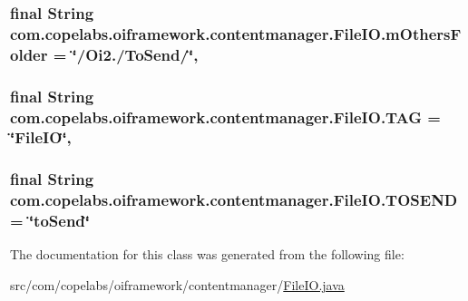 \subsubsection[{m\+Others\+Folder}]{\setlength{\rightskip}{0pt plus 5cm}final String com.\+copelabs.\+oiframework.\+contentmanager.\+File\+I\+O.\+m\+Others\+Folder = \char`\"{}/Oi2./To\+Send/\char`\"{}\hspace{0.3cm}{\ttfamily [static]}, {\ttfamily [private]}}\label{classcom_1_1copelabs_1_1oiframework_1_1contentmanager_1_1_file_i_o_af98e1837f90964eaf6beba0ad81a3ac9}
\hypertarget{classcom_1_1copelabs_1_1oiframework_1_1contentmanager_1_1_file_i_o_a3c9a4822f7f3f13c35b80a570bb99304}{}
\subsubsection[{T\+A\+G}]{\setlength{\rightskip}{0pt plus 5cm}final String com.\+copelabs.\+oiframework.\+contentmanager.\+File\+I\+O.\+T\+A\+G = \char`\"{}File\+I\+O\char`\"{}\hspace{0.3cm}{\ttfamily [static]}, {\ttfamily [private]}}\label{classcom_1_1copelabs_1_1oiframework_1_1contentmanager_1_1_file_i_o_a3c9a4822f7f3f13c35b80a570bb99304}
\hypertarget{classcom_1_1copelabs_1_1oiframework_1_1contentmanager_1_1_file_i_o_abe358da5948b9b2ff2c7665a57449c1b}{}
\subsubsection[{T\+O\+S\+E\+N\+D}]{\setlength{\rightskip}{0pt plus 5cm}final String com.\+copelabs.\+oiframework.\+contentmanager.\+File\+I\+O.\+T\+O\+S\+E\+N\+D = \char`\"{}to\+Send\char`\"{}\hspace{0.3cm}{\ttfamily [static]}}\label{classcom_1_1copelabs_1_1oiframework_1_1contentmanager_1_1_file_i_o_abe358da5948b9b2ff2c7665a57449c1b}


The documentation for this class was generated from the following file\+:\begin{DoxyCompactItemize}
\item 
src/com/copelabs/oiframework/contentmanager/\hyperlink{_file_i_o_8java}{File\+I\+O.\+java}\end{DoxyCompactItemize}

